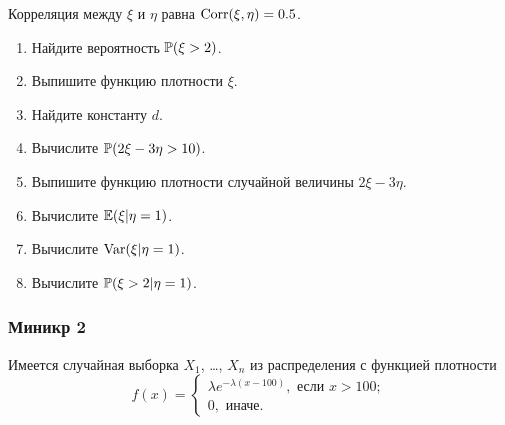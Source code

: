 Корреляция между $\xi$ и $\eta$ равна $\Corr(\xi, \eta)= 0.5$.


\begin{enumerate}
\item Найдите вероятность $\P(\xi > 2)$.
\item Выпишите функцию плотности $\xi$.
\item Найдите константу $d$. 
\item Вычислите $\P(2\xi -3\eta >10)$.
\item Выпишите функцию плотности случайной величины $2\xi -3\eta$.
\item Вычислите $\E(\xi |\eta = 1)$.
\item Вычислите $\Var(\xi |\eta = 1)$.
\item Вычислите $\P(\xi > 2 |\eta = 1)$.
\end{enumerate}


\subsubsection*{Миникр 2}

Имеется случайная выборка $X_1$, \ldots, $X_n$ из распределения с функцией плотности
\[
f(x) = \begin{cases}
  \lambda e^{-\lambda(x-100)}, \text{ если } x > 100; \\
  0, \text{ иначе.}  
\end{cases}
\]
  
